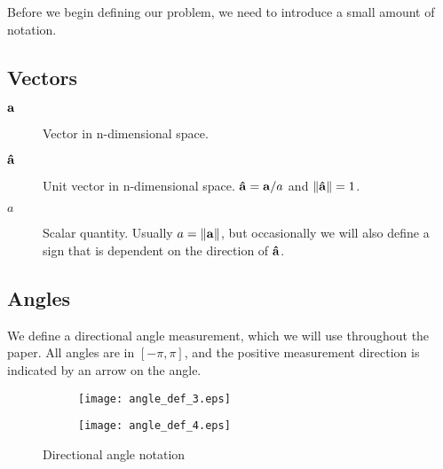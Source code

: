 Before we begin defining our problem, we need to introduce a small amount of notation.

\subsection{Vectors}

\begin{description}
  \item[$\mathbf{a}$] Vector in n-dimensional space.
  \item[$\mathbf{\hat{a}}$] Unit vector in n-dimensional space. $\mathbf{\hat{a}} = \mathbf{a}/a$ and $\norm{\bhat{a}} = 1$.
  \item[$a$] Scalar quantity. Usually $a = \norm{\bvec{a}}$, but occasionally we will also define a sign that is dependent on the direction of $\mathbf{\hat{a}}$.
\end{description}

\subsection{Angles}

We define a directional angle measurement, which we will use throughout the paper. All angles are in $[-\pi, \pi]$, and the positive measurement direction is indicated by an arrow on the angle.

\begin{figure}[H]
  \begin{subfigure}[b]{0.3\textwidth}
    \texttt{[image: angle\_def\_3.eps]}
    \caption{}
    \label{fig:angle-def-3}
  \end{subfigure}
  \qquad \qquad
  \begin{subfigure}[b]{0.3\textwidth}
    \texttt{[image: angle\_def\_4.eps]}
    \caption{}
    \label{fig:angle-def-4}
  \end{subfigure}
  \caption{Directional angle notation}
\end{figure}
